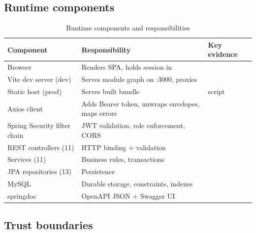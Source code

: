 \subsection{Runtime components}
\begin{table}[H]
\centering
\caption{Runtime components and responsibilities}
\label{tab:runtime-components}
\begin{tabular}{@{}L{3.6cm}L{5.4cm}L{5.2cm}@{}}
\toprule
\textbf{Component} & \textbf{Responsibility} & \textbf{Key evidence} \\
\midrule
Browser & Renders SPA, holds session in  &  \\
Vite dev server (dev) & Serves module graph on :3000, proxies  &  \\
Static host (prod) & Serves built  bundle &  script \\
Axios client & Adds Bearer token, unwraps envelopes, maps errors &  \\
Spring Security filter chain & JWT validation, role enforcement, CORS &  \\
REST controllers (11) & HTTP binding + validation &  \\
Services (11) & Business rules, transactions &  \\
JPA repositories (13) & Persistence &  \\
MySQL & Durable storage, constraints, indexes &  \\
springdoc & OpenAPI JSON + Swagger UI &  \\
\bottomrule
\end{tabular}
\end{table}

\subsection{Trust boundaries}


